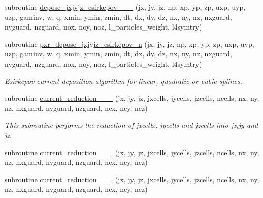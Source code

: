 \begin{DoxyCompactItemize}
\item 
subroutine \hyperlink{current__deposition_8_f90_a764fd99e306237a96ae8675235ca96bb}{depose\+\_\+jxjyjz\+\_\+esirkepov\+\_\+\_\+\_} (jx, jy, jz, np, xp, yp, zp, uxp, uyp, uzp, gaminv, w, q, xmin, ymin, zmin,                                                                                                                                                   dt, dx, dy, dz, nx, ny, nz, nxguard, nyguard, nzguard,                                                                                                                                                   nox, noy, noz, l\+\_\+particles\+\_\+weight, l4symtry)
\item 
subroutine \hyperlink{current__deposition_8_f90_addb36b5ec8b753baa5098db4d6de7820}{pxr\+\_\+depose\+\_\+jxjyjz\+\_\+esirkepov\+\_\+n} (jx, jy, jz, np, xp, yp, zp, uxp, uyp, uzp, gaminv, w, q, xmin, ymin, zmin, dt, dx, dy, dz, nx, ny, nz, nxguard, nyguard, nzguard, nox, noy, noz, l\+\_\+particles\+\_\+weight, l4symtry)
\begin{DoxyCompactList}\small\item\em Esirkepov current deposition algorithm for linear, quadratic or cubic splines. \end{DoxyCompactList}\item 
subroutine \hyperlink{current__deposition_8_f90_a7fc8e2e07f2c45b26fa3388a9e519c4e}{current\+\_\+reduction\+\_\+\_\+\_} (jx, jy, jz, jxcells, jycells, jzcells, ncells, nx, ny, nz, nxguard, nyguard, nzguard, ncx, ncy, ncz)
\begin{DoxyCompactList}\small\item\em This subroutine performs the reduction of jxcellx, jycells and jzcells into jx,jy and jz. \end{DoxyCompactList}\item 
subroutine \hyperlink{current__deposition_8_f90_a4a6549c8cf282fb4e1818da1e6696fe1}{current\+\_\+reduction\+\_\+\_\+\_} (jx, jy, jz, jxcells, jycells, jzcells, ncells, nx, ny, nz, nxguard, nyguard, nzguard, ncx, ncy, ncz)
\item 
subroutine \hyperlink{current__deposition_8_f90_a1c3d937e970b554b85e71cb31e708636}{current\+\_\+reduction\+\_\+\_\+\_} (jx, jy, jz, jxcells, jycells, jzcells, ncells,                                                                                                                                   nx, ny, nz, nxguard, nyguard, nzguard, ncx, ncy, ncz)
\end{DoxyCompactItemize}


